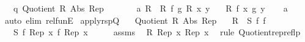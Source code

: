 \begin{isabellebody}
\ \ \ q{\isacharcolon}{\kern0pt}\ {\isachardoublequoteopen}Quotient{}\ R{}\ Abs{}\ Rep{}{\isachardoublequoteclose}\isanewline
\ \ \ \ \ \ \ a{\isacharcolon}{\kern0pt}\ {\isachardoublequoteopen}{\isacharparenleft}{\kern0pt}R{}\ {\isacharequal}{\kern0pt}{\isacharequal}{\kern0pt}{\isacharequal}{\kern0pt}{\isachargreater}{\kern0pt}\ R{}{\isacharparenright}{\kern0pt}\ f\ g{\isachardoublequoteclose}\ {\isachardoublequoteopen}R{}\ x\ y{\isachardoublequoteclose}\isanewline
\ \ \ {\isachardoublequoteopen}R{}\ {\isacharparenleft}{\kern0pt}f\ x{\isacharparenright}{\kern0pt}\ {\isacharparenleft}{\kern0pt}g\ y{\isacharparenright}{\kern0pt}{\isachardoublequoteclose}\isanewline
%
\isadelimproof
\ \ %
\endisadelimproof
%
\isatagproof
{}\isamarkupfalse%
\ a\ \isamarkupfalse%
\ {\isacharparenleft}{\kern0pt}auto\ elim{\isacharcolon}{\kern0pt}\ rel{\isacharunderscore}{\kern0pt}funE{\isacharparenright}{\kern0pt}%
\endisatagproof
{\isafoldproof}%
%
\isadelimproof
\isanewline
%
\endisadelimproof
\isanewline
{}\isamarkupfalse%
\ apply{\isacharunderscore}{\kern0pt}rspQ{}{\isacharprime}{\kern0pt}{\isacharprime}{\kern0pt}{\isacharcolon}{\kern0pt}\isanewline
\ \ \ {\isachardoublequoteopen}Quotient{}\ R\ Abs\ Rep{\isachardoublequoteclose}\isanewline
\ \ \ {\isachardoublequoteopen}{\isacharparenleft}{\kern0pt}R\ {\isacharequal}{\kern0pt}{\isacharequal}{\kern0pt}{\isacharequal}{\kern0pt}{\isachargreater}{\kern0pt}\ S{\isacharparenright}{\kern0pt}\ f\ f{\isachardoublequoteclose}\isanewline
\ \ \ {\isachardoublequoteopen}S\ {\isacharparenleft}{\kern0pt}f\ {\isacharparenleft}{\kern0pt}Rep\ x{\isacharparenright}{\kern0pt}{\isacharparenright}{\kern0pt}\ {\isacharparenleft}{\kern0pt}f\ {\isacharparenleft}{\kern0pt}Rep\ x{\isacharparenright}{\kern0pt}{\isacharparenright}{\kern0pt}{\isachardoublequoteclose}\isanewline
%
\isadelimproof
%
\endisadelimproof
%
\isatagproof
{}\isamarkupfalse%
\ {\isacharminus}{\kern0pt}\isanewline
\ \ \isamarkupfalse%
\ assms{\isacharparenleft}{\kern0pt}{}{\isacharparenright}{\kern0pt}\ \isamarkupfalse%
\ {\isachardoublequoteopen}R\ {\isacharparenleft}{\kern0pt}Rep\ x{\isacharparenright}{\kern0pt}\ {\isacharparenleft}{\kern0pt}Rep\ x{\isacharparenright}{\kern0pt}{\isachardoublequoteclose}\ \isamarkupfalse%
\ {\isacharparenleft}{\kern0pt}rule\ Quotient{}{\isacharunderscore}{\kern0pt}rep{\isacharunderscore}{\kern0pt}reflp{\isacharparenright}{\kern0pt}\isanewline

\end{isabellebody}
